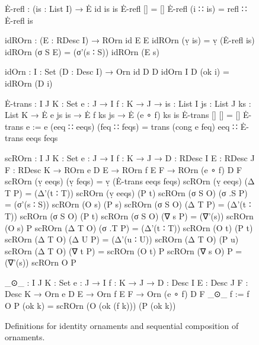 \begin{figure}
\codefigure\small
\begin{code}
Ė-refl : (is : List I) → Ė id is is
Ė-refl []        = []
Ė-refl (i ∷ is)  = refl ∷ Ė-refl is

idROrn : (E : RDesc I) → ROrn id E E
idROrn (ṿ is)   = ṿ (Ė-refl is)
idROrn (σ S E)  = (σ'(s ∶ S)) idROrn (E s)

idOrn : {I : Set} (D : Desc I) → Orn id D D
idOrn {I} D (ok i) = idROrn (D i)

Ė-trans :  {I J K : Set} {e : J → I} {f : K → J} →
           {is : List I} {js : List J} {ks : List K} →
           Ė e js is → Ė f ks js → Ė (e ∘ f) ks is
Ė-trans           []            []            =  []
Ė-trans {e := e}  (eeq ∷ eeqs)  (feq ∷ feqs)  =  trans (cong e feq) eeq ∷ Ė-trans eeqs feqs

scROrn :  {I J K : Set} {e : J → I} {f : K → J} →
          {D : RDesc I} {E : RDesc J} {F : RDesc K} →
          ROrn e D E → ROrn f E F → ROrn (e ∘ f) D F
scROrn (ṿ eeqs)  (ṿ feqs)  = ṿ (Ė-trans eeqs feqs)
scROrn (ṿ eeqs)  (Δ T P)   = (Δ'(t ∶ T))  scROrn (ṿ eeqs)  (P t)
scROrn (σ S O)   (σ .S P)  = (σ'(s ∶ S))  scROrn (O s)     (P s)
scROrn (σ S O)   (Δ T P)   = (Δ'(t ∶ T))  scROrn (σ S O)   (P t)
scROrn (σ S O)   (∇ s P)   = (∇'(s))      scROrn (O s)     P
scROrn (Δ T O)   (σ .T P)  = (Δ'(t ∶ T))  scROrn (O t)     (P t)
scROrn (Δ T O)   (Δ U P)   = (Δ'(u ∶ U))  scROrn (Δ T O)   (P u)
scROrn (Δ T O)   (∇ t P)   =              scROrn (O t)     P
scROrn (∇ s O)   P         = (∇'(s))      scROrn O         P

_⊙_ :  {I J K : Set} {e : J → I} {f : K → J} →
       {D : Desc I} {E : Desc J} {F : Desc K} →
       Orn e D E → Orn f E F → Orn (e ∘ f) D F
_⊙_ {f := f} O P (ok k) = scROrn (O (ok (f k))) (P (ok k))
\end{code}
\caption{Definitions for identity ornaments and sequential composition of ornaments.}
\label{fig:sequential-composition}
\end{figure}

